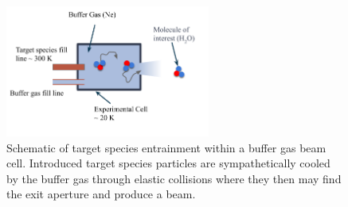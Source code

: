 \begin{figure}
	\centering
	\includegraphics[width=0.6\textwidth]{images/CBGB_diagram.png}
	\caption{Schematic of target species entrainment within a buffer gas beam cell. Introduced target species particles are sympathetically cooled by the buffer gas through elastic collisions where they then may find the exit aperture and produce a beam.}
\end{figure}

